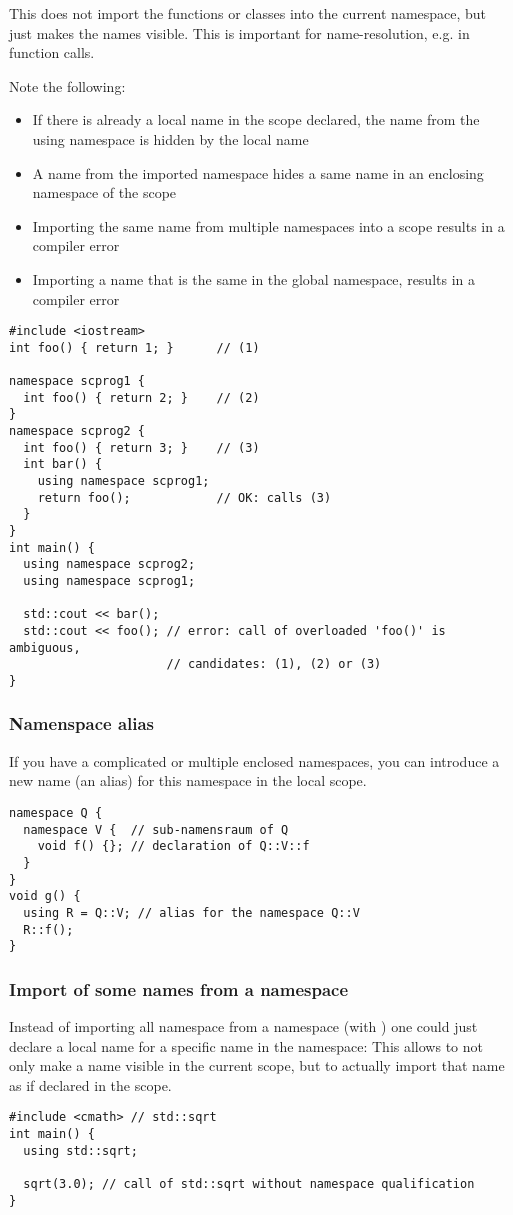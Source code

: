 This does not import the functions or classes into the current namespace, but just makes the names visible. This is important for name-resolution, e.g.
in function calls.

Note the following:
\begin{itemize}
\item If there is already a local name in the scope declared, the name from the using namespace is hidden by the local name
\item A name from the imported namespace hides a same name in an enclosing namespace of the scope
\item Importing the same name from multiple namespaces into a scope results in a compiler error
\item Importing a name that is the same in the global namespace, results in a compiler error
\end{itemize}

\begin{verbatim}
#include <iostream>
int foo() { return 1; }      // (1)

namespace scprog1 {
  int foo() { return 2; }    // (2)
}
namespace scprog2 {
  int foo() { return 3; }    // (3)
  int bar() {
    using namespace scprog1;
    return foo();            // OK: calls (3)
  }
}
int main() {
  using namespace scprog2;
  using namespace scprog1;

  std::cout << bar();
  std::cout << foo(); // error: call of overloaded 'foo()' is ambiguous,
                      // candidates: (1), (2) or (3)
}
\end{verbatim}

\subsubsection{Namenspace alias}
If you have a complicated or multiple enclosed namespaces, you can introduce a new name (an alias) for this namespace in the local scope.
%
\begin{verbatim}
namespace Q {
  namespace V {  // sub-namensraum of Q
    void f() {}; // declaration of Q::V::f
  }
}
void g() {
  using R = Q::V; // alias for the namespace Q::V
  R::f();
}
\end{verbatim}

\subsubsection{Import of some names from a namespace}
Instead of importing all namespace from a namespace (with ) one could just declare a local name for a specific name in the namespace:
This allows to not only make a name visible in the current scope, but to actually import that name as if declared in the scope.
%
\begin{verbatim}
#include <cmath> // std::sqrt
int main() {
  using std::sqrt;

  sqrt(3.0); // call of std::sqrt without namespace qualification
}
\end{verbatim}

